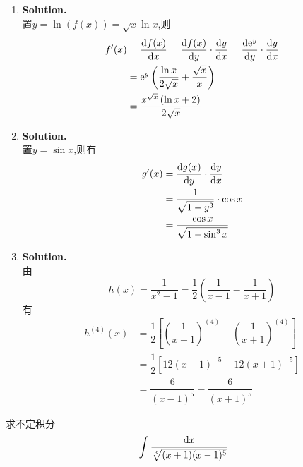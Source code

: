 \documentclass{ctexart}
\begin{document}
\begin{solution}[Solution.]
    \begin{enumerate}[label=\textbf{(\arabic*)},leftmargin=*]
        \item \textbf{Solution.}\\
            置$y=\ln(f(x))=\sqrt{x}\ln x$,则
            \begin{align*}
                f'(x)
                &= \dfrac{\mathrm{d} f(x)}{\mathrm{d} x}=\dfrac{\mathrm{d} f(x)}{\mathrm{d} y}\cdot\dfrac{\mathrm{d} y}{\mathrm{d} x}=\dfrac{\mathrm{d} \mathrm{e}^y}{\mathrm{d} y}\cdot\dfrac{\mathrm{d} y}{\mathrm{d} x} \\
                &= \mathrm{e}^y\left(\dfrac{\ln x}{2\sqrt{x}}+\dfrac{\sqrt{x}}{x}\right) \\
                &= \dfrac{x^{\sqrt{x}}\left(\ln x+2\right)}{2\sqrt{x}}
            \end{align*}
        \item \textbf{Solution.}\\
            置$y=\sin x$,则有
            \begin{align*}
                g'(x)
                &= \dfrac{\mathrm{d} g(x)}{\mathrm{d} y}\cdot\dfrac{\mathrm{d} y}{\mathrm{d} x} \\
                &= \dfrac{1}{\sqrt{1-y^3}}\cdot\cos x \\
                &= \dfrac{\cos x}{\sqrt{1-\sin^3 x}}
            \end{align*}
        \item \textbf{Solution.}\\
            由$$h(x)=\dfrac{1}{x^2-1}=\dfrac{1}{2}\left(\dfrac{1}{x-1}-\dfrac{1}{x+1}\right)$$
            有\begin{align*}
                h^{(4)}(x)
                &= \dfrac{1}{2}\left[\left(\dfrac{1}{x-1}\right)^{(4)}-\left(\dfrac{1}{x+1}\right)^{(4)}\right] \\
                &= \dfrac{1}{2}\left[12\left(x-1\right)^{-5}-12\left(x+1\right)^{-5}\right] \\
                &= \dfrac{6}{(x-1)^5}-\dfrac{6}{(x+1)^5}
            \end{align*}
    \end{enumerate}
\end{solution}
\begin{problem}[3.(15\songti{分})]
    求不定积分$$\int{\dfrac{\mathrm{d}x}{\sqrt[3]{(x+1)(x-1)^5}}}$$
\end{problem}
\end{document}

